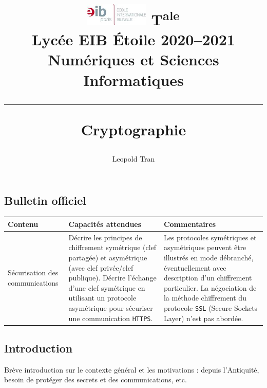 \documentclass[a4paper,11pt]{article}
\title{
{\normalsize
\vspace*{-1.5cm}
\includegraphics[width=3cm]{eib_logo.jpg}
% 
\hfill
T\textsuperscript{ale}\\
Lycée EIB \'Etoile 2020--2021
\hfill
{\sc Numériques et Sciences Informatiques}
\hrule%
\vspace{5mm}%
}
{\sc Cryptographie}  %
}%
\author{Leopold {\sc Tran}}
\begin{document}
\maketitle       %
\tableofcontents %
\thispagestyle{fancy} %

\subsection*{Bulletin officiel} %

\begin{center}
\begin{tabular}{|p{5cm}|p{5cm}|p{5cm}|}\hline
{\bf Contenu} & {\bf Capacités attendues} & {\bf Commentaires}\\\hline
Sécurisation des communications
&
Décrire les principes de chiffrement symétrique (clef partagée) et asymétrique (avec clef privée/clef publique).
Décrire l'échange d'une clef symétrique en utilisant un protocole asymétrique pour sécuriser une communication {\tt HTTPS}.
&
Les protocoles symétriques et asymétriques peuvent être illustrés en mode débranché, éventuellement avec description d'un chiffrement particulier.
La négociation de la méthode chiffrement du protocole {\tt SSL} (Secure Sockets Layer) n'est pas abordée.
\\\hline
\end{tabular}
\end{center}
  

\subsection*{Introduction}

Brève introduction sur le contexte général et les motivations : depuis l'Antiquité, besoin de protéger des secrets et des communications, etc.
\end{document}
